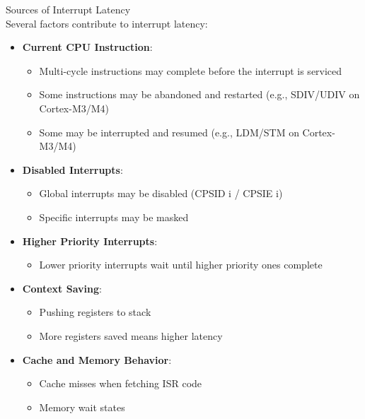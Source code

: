 \begin{concept}{Sources of Interrupt Latency}\\
Several factors contribute to interrupt latency:
\begin{itemize}
    \item \textbf{Current CPU Instruction}:
    \begin{itemize}
        \item Multi-cycle instructions may complete before the interrupt is serviced
        \item Some instructions may be abandoned and restarted (e.g., SDIV/UDIV on Cortex-M3/M4)
        \item Some may be interrupted and resumed (e.g., LDM/STM on Cortex-M3/M4)
    \end{itemize}
    \item \textbf{Disabled Interrupts}:
    \begin{itemize}
        \item Global interrupts may be disabled (CPSID i / CPSIE i)
        \item Specific interrupts may be masked
    \end{itemize}
    \item \textbf{Higher Priority Interrupts}:
    \begin{itemize}
        \item Lower priority interrupts wait until higher priority ones complete
    \end{itemize}
    \item \textbf{Context Saving}:
    \begin{itemize}
        \item Pushing registers to stack
        \item More registers saved means higher latency
    \end{itemize}
    \item \textbf{Cache and Memory Behavior}:
    \begin{itemize}
        \item Cache misses when fetching ISR code
        \item Memory wait states
    \end{itemize}
\end{itemize}
\end{concept}

